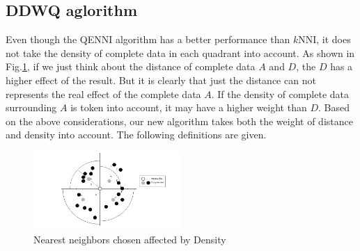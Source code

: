 \documentclass[print]{jicspack}
\begin{document}
\subsection{DDWQ aglorithm}
\label{2.4}
Even though the QENNI algorithm has a better performance than $k$NNI, it does not take the density of complete data in each quadrant into account. As shown in Fig.\ref{fig:figure3}, if we just think about the distance of complete data $A$ and $D$, the $D$ has a higher effect of the result. But it is clearly that just the distance can not represents the real effect of the complete data $A$. If the density of complete data surrounding $A$ is token into account, it may have a higher weight than $D$. Based on the above considerations, our new algorithm takes both the weight of distance and density into account. The following definitions are given.
\begin{figure}[h]
\centering
\includegraphics[angle=0, width=0.5\textwidth]{figure3.png}
\caption{Nearest neighbors chosen affected by Density}
\label{fig:figure3}
\end{figure}
\end{document}

